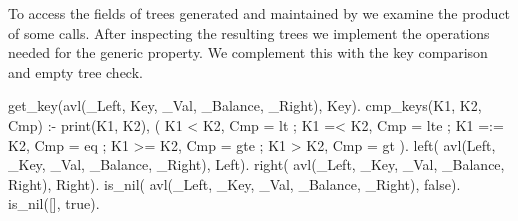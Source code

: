 To access the fields of trees generated and maintained by 
we examine the product of some calls.
%
After inspecting the resulting trees we implement the operations needed
for the generic property.
%
We complement this with the key comparison and empty tree check.
%
\begin{yapcode}
 get_key(avl(_Left, Key, _Val,
             _Balance, _Right), Key).
 cmp_keys(K1, K2, Cmp) :-
   print({K1, K2}),
 ( K1 < K2, Cmp = lt
 ; K1 =< K2, Cmp = lte
 ; K1 =:= K2, Cmp = eq
 ; K1 >= K2, Cmp = gte
 ; K1 > K2, Cmp = gt
 ).
 left( avl(Left, _Key, _Val,
           _Balance, _Right), Left).
 right( avl(_Left, _Key, _Val,
            _Balance, Right), Right).
 is_nil( avl(_Left, _Key, _Val,
             _Balance, _Right), false).
 is_nil([], true).
\end{yapcode}



